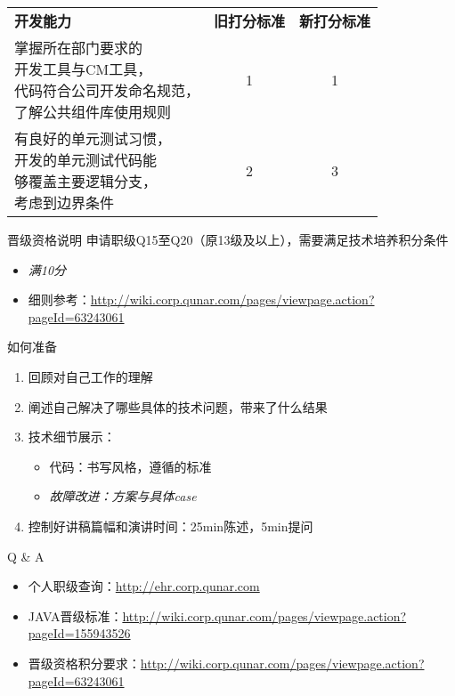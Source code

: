 \documentclass{beamer}
\begin{document}
\begin{CJK}{UTF8}{gbsn}
\begin{frame}
  \begin{tabular}{l | c | c}
    \hline
    \textbf{开发能力} & \textbf{旧打分标准} & \textbf{新打分标准} \\
    \hline
        { 掌握所在部门要求的 \\
          开发工具与CM工具，\\
          代码符合公司开发命名规范，\\
          了解公共组件库使用规则 } & {1} & {1} \\
    \hline
            { 有良好的单元测试习惯，\\
              开发的单元测试代码能\\
              够覆盖主要逻辑分支，\\
              考虑到边界条件 } & {2} & {3} \\
    \hline
  \end{tabular}

\end{frame}

\begin{frame}{晋级资格说明}
  申请职级Q15至Q20（原13级及以上），需要满足技术培养积分条件
  \begin{itemize}
  \item {
    \emph{满10分}
  }
  \item {细则参考：\url{http://wiki.corp.qunar.com/pages/viewpage.action?pageId=63243061}}
  \end{itemize}
  
\end{frame}


\begin{frame}{如何准备}
  \begin{enumerate}
  \item {
    回顾对自己工作的理解
  }
  \item {
    阐述自己解决了哪些具体的技术问题，带来了什么结果
  }
  \item {
    技术细节展示：
    \begin{itemize}
    \item { 代码：书写风格，遵循的标准 }
    \item \emph{故障改进：方案与具体case}
    \end{itemize}
  }
  \item {
    控制好讲稿篇幅和演讲时间：25min陈述，5min提问
  }
  \end{enumerate}
\end{frame}

\begin{frame}{Q \& A}
  \begin{itemize}
  \item {
    个人职级查询：\url{http://ehr.corp.qunar.com}
  }
  \item {
    JAVA晋级标准：\url{http://wiki.corp.qunar.com/pages/viewpage.action?pageId=155943526}
  }
  \item {
    晋级资格积分要求：\url{http://wiki.corp.qunar.com/pages/viewpage.action?pageId=63243061}
  }
  \end{itemize}
\end{frame}


\end{CJK}
\end{document}
